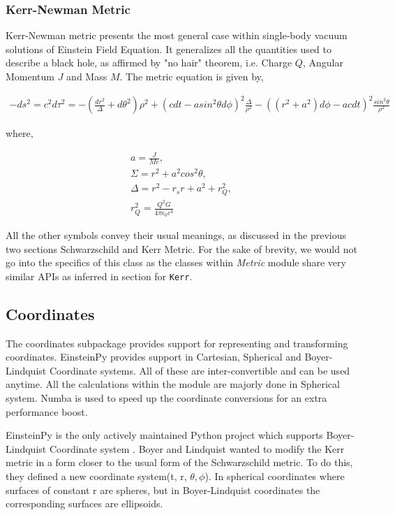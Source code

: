 \documentclass[onecolumn]{aa}
\begin{document}
\subsubsection{Kerr-Newman Metric}
Kerr-Newman metric \citep{Adamo:2014baa} presents the most general case within single-body vacuum solutions of Einstein Field Equation. It generalizes all the quantities used to describe a black hole, as affirmed by "no hair" theorem, i.e. Charge $Q$, Angular Momentum $J$ and Mass $M$. The metric equation is given by,

\begin{gather}
-ds^2 = c^2 d\tau^2 = -(\frac{dr^2}{\Delta}+d\theta^2)\rho^2 + (c dt - a sin^2 \theta d\phi)^2 \frac{\Delta}{\rho^2} - ((r^2 + a^2)d\phi - ac dt)^2 \frac{sin^2 \theta}{\rho^2}
\end{gather}

where,

\begin{gather}
a = \frac{J}{Mc}, \nonumber \\
\Sigma = r^2 + a^2 cos^2 \theta , \nonumber  \\
\Delta  = r^2 - r_s r + a^2 + r_Q ^ 2, \nonumber \\
r_Q ^ 2 = \frac{Q^2 G}{4\pi\epsilon_0 c^4} \nonumber
\end{gather}

All the other symbols convey their usual meanings, as discussed in the previous two sections Schwarzschild and Kerr Metric. For the sake of brevity, we would not go into the specifics of this class as the classes within \textit{Metric} module share very similar APIs as inferred in section for \texttt{Kerr}.

\subsection{Coordinates}
The coordinates subpackage provides support for representing and transforming coordinates. EinsteinPy provides support in Cartesian, Spherical and Boyer-Lindquist Coordinate systems. All of these are inter-convertible and can be used anytime. All the calculations within the module are majorly done in Spherical system. Numba \citep{Lam2015NumbaAL} is used to speed up the coordinate conversions for an extra performance boost.
 
EinsteinPy is the only actively maintained Python project which supports Boyer-Lindquist Coordinate system \citep{doi:10.1063/1.1705193}. Boyer and Lindquist wanted to modify the Kerr metric in a form closer to the usual form of the Schwarzschild metric. To do this, they defined a new coordinate system(t, r, $ \theta, \phi$).  In spherical coordinates where surfaces of constant r are spheres, but in  Boyer-Lindquist coordinates the corresponding surfaces are ellipsoids. 
\end{document}
